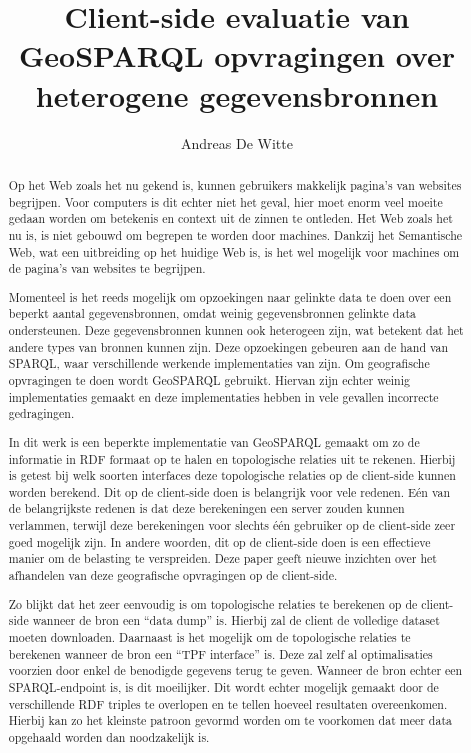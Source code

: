 \documentclass[twocolumn]{phdsymp} %
\begin{document}
\title{Client-side evaluatie van GeoSPARQL opvragingen over heterogene gegevensbronnen} %

\author{Andreas De Witte}


\maketitle

\begin{abstract}
    Op het Web zoals het nu gekend is, kunnen gebruikers makkelijk pagina's van websites begrijpen. Voor computers is dit echter niet het geval, hier moet enorm veel moeite gedaan worden om betekenis en context uit de zinnen te ontleden. Het Web zoals het nu is, is niet gebouwd om begrepen te worden door machines. Dankzij het Semantische Web, wat een uitbreiding op het huidige Web is, is het wel mogelijk voor machines om de pagina's van websites te begrijpen.
    
    Momenteel is het reeds mogelijk om opzoekingen naar gelinkte data te doen over een beperkt aantal gegevensbronnen, omdat weinig gegevensbronnen gelinkte data ondersteunen. Deze gegevensbronnen kunnen ook heterogeen zijn, wat betekent dat het andere types van bronnen kunnen zijn. Deze opzoekingen gebeuren aan de hand van SPARQL, waar verschillende werkende implementaties van zijn. Om geografische opvragingen te doen wordt GeoSPARQL gebruikt. Hiervan zijn echter weinig implementaties gemaakt en deze implementaties hebben in vele gevallen incorrecte gedragingen.
    
    In dit werk is een beperkte implementatie van GeoSPARQL gemaakt om zo de informatie in RDF formaat op te halen en topologische relaties uit te rekenen. Hierbij is getest bij welk soorten interfaces deze topologische relaties op de client-side kunnen worden berekend. Dit op de client-side doen is belangrijk voor vele redenen. Eén van de belangrijkste redenen is dat deze berekeningen een server zouden kunnen verlammen, terwijl deze berekeningen voor slechts één gebruiker op de client-side zeer goed mogelijk zijn. In andere woorden, dit op de client-side doen is een effectieve manier om de belasting te verspreiden. Deze paper geeft nieuwe inzichten over het afhandelen van deze geografische opvragingen op de client-side.

    Zo blijkt dat het zeer eenvoudig is om topologische relaties te berekenen op de client-side wanneer de bron een ``data dump'' is. Hierbij zal de client de volledige dataset moeten downloaden. Daarnaast is het mogelijk om de topologische relaties te berekenen wanneer de bron een ``TPF interface'' is. Deze zal zelf al optimalisaties voorzien door enkel de benodigde gegevens terug te geven. Wanneer de bron echter een SPARQL-endpoint is, is dit moeilijker. Dit wordt echter mogelijk gemaakt door de verschillende RDF triples te overlopen en te tellen hoeveel resultaten overeenkomen. Hierbij kan zo het kleinste patroon gevormd worden om te voorkomen dat meer data opgehaald worden dan noodzakelijk is.
    

\end{abstract}
\end{document}

